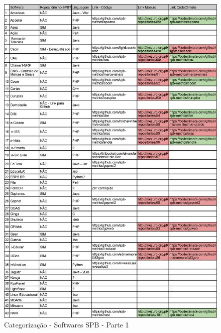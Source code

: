 \begin{anexosenv}

\begin{figure}[!htb]
	\centering
    \includegraphics[keepaspectratio=true,scale=0.85]
    {tabelas/spb_1.eps}
  \caption{Categorização - Softwares SPB - Parte 1}
  \label{fig:softwares_spb_1}
\end{figure}


\end{anexosenv}
